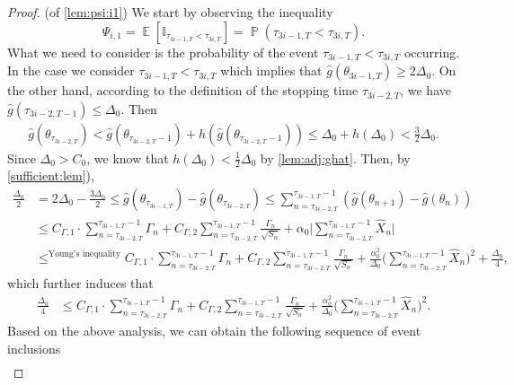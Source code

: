 \documentclass[standalone]{article}
\newcommand{\I}{\mathbb{I}}
\DeclareMathOperator{\Expect}{\mathbb{E}}
\DeclareMathOperator{\pro}{\mathbb{P}}
\begin{document}
\begin{proof}(of \cref{lem:psi:i1})
We start by observing the inequality
\[\Psi_{i,1}=\Expect[\I_{\tau_{3i-1, T} < \tau_{3i, T}}]=\pro(\tau_{3i-1, T} < \tau_{3i, T}).\]
What we need to consider is the probability of the event $\tau_{3i-1, T} < \tau_{3i, T}$ occurring. In the case we consider $\tau_{3i-1, T} < \tau_{3i, T}$ which implies that $\hat{g}(\theta_{3i-1, T}) \geq 2\Delta_0$. On the other hand, according to the definition of the stopping time $\tau_{3i-2,T}$, we have $\hat{g}(\tau_{{3i-2, T}-1}) \leq \Delta_0$. Then
\begin{align*}
\hat{g}(\theta_{\tau_{3i-2,T}}) <  \hat{g}(\theta_{\tau_{3i-2,T}-1})+h(\hat{g}(\theta_{\tau_{3i-2,T}-1})) \leq \Delta_0 + h(\Delta_0) < \frac{3}{2}\Delta_0.
\end{align*}
Since \(\Delta_0 > C_{0}\), we know that \( h(\Delta_0) < \frac{1}{2}\Delta_0\) by \cref{lem:adj:ghat}.  Then, by \cref{sufficient:lem}),
\begin{align*}
\frac{\Delta_0}{2} &=2\Delta_0-\frac{3\Delta_0}{2}\le \hat{g}(\theta_{\tau_{3i-1,T}})-\hat{g}(\theta_{\tau_{3i-2,T}})\le \sum_{n=\tau_{3i-2,T}}^{\tau_{3i-1,T}-1}(\hat{g}(\theta_{n+1})-\hat{g}(\theta_{n}))\\&\le C_{\Gamma,1}\cdot \sum_{n=\tau_{3i-2,T}}^{\tau_{3i-1,T}-1}\Gamma_n  +C_{\Gamma,2}\sum_{n=\tau_{3i-2,T}}^{\tau_{3i-1,T}-1}\frac{\Gamma_{n}}{\sqrt{S_{n}}} + \alpha_0\Bigg| \sum_{n=\tau_{3i-2,T}}^{\tau_{3i-1,T}-1}\hat{X}_{n}\Bigg|\\& \mathop{\le}^{\text{Young's inequality}} C_{\Gamma,1}\cdot \sum_{n=\tau_{3i-2,T}}^{\tau_{3i-1,T}-1}\Gamma_n  +C_{\Gamma,2}\sum_{n=\tau_{3i-2,T}}^{\tau_{3i-1,T}-1}\frac{\Gamma_{n}}{\sqrt{S_{n}}}+\frac{\alpha_0^{2}}{\Delta_0}\Bigg( \sum_{n=\tau_{3i-2,T}}^{\tau_{3i-1,T}-1}\hat{X}_{n}\Bigg)^{2}  + \frac{\Delta_0}{4},
\end{align*} 
which further induces that 
\begin{equation}\label{power_00}\begin{aligned}
\frac{\Delta_0}{4}&\le  C_{\Gamma,1}\cdot \sum_{n=\tau_{3i-2,T}}^{\tau_{3i-1,T}-1}\Gamma_n  +C_{\Gamma,2}\sum_{n=\tau_{3i-2,T}}^{\tau_{3i-1,T}-1}\frac{\Gamma_{n}}{\sqrt{S_{n}}}  + \frac{\alpha_0^{2}}{\Delta_0}\Bigg( \sum_{n=\tau_{3i-2,T}}^{\tau_{3i-1,T}-1}\hat{X}_{n}\Bigg)^{2}.
\end{aligned}\end{equation}
Based on the above analysis, we can obtain the following sequence of event inclusions
\begin{align*}

\end{align*}
\end{proof}
\end{document}
